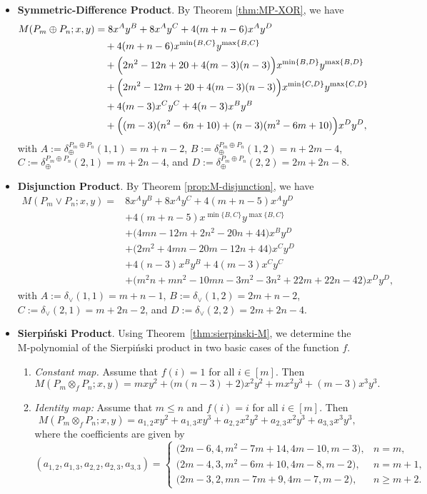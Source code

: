\documentclass[letterpaper,12pt]{article}
\begin{document}
\begin{itemize}
\item\textbf{Symmetric-Difference Product}. 
By Theorem \ref{thm:MP-XOR}, we have 
\[
\begin{aligned}
M(P_m\oplus P_n;x,y) & = 
8x^{A}y^{B}+8x^{A}y^{C}+4(m+n-6)x^{A}y^{D}\\
&\quad  +4(m+n-6) x^{\min\{B,C\}}y^{\max\{B,C\}}\\
&\quad  +\Bigl(2n^2-12n+20+4(m-3)(n-3)\Bigr) x^{\min\{B,D\}}y^{\max\{B,D\}}\\
&\quad  +\Bigl(2m^2-12m+20+4(m-3)(n-3)\Bigr) x^{\min\{C,D\}}y^{\max\{C,D\}}\\
&\quad  +4(m-3)x^{C}y^{C}+4(n-3)x^{B}y^{B}\\
&\quad  +\Bigl((m-3)(n^2-6n+10)+(n-3)(m^2-6m+10)\Bigr) x^{D}y^{D},
\end{aligned}
\]
with $A:=\delta_\oplus^{P_m\oplus P_n}(1,1)=m+n-2$, $B:=\delta_\oplus^{P_m\oplus P_n}(1,2)=n+2m-4$, $C:=\delta_\oplus^{P_m\oplus P_n}(2,1)=m+2n-4$, and $D:=\delta_\oplus^{P_m\oplus P_n}(2,2)=2m+2n-8$.


\item\textbf{Disjunction Product}. By Theorem \ref{prop:M-disjunction}, we have 
\[
\begin{aligned}
M(P_m\vee P_n;x,y)= &
8x^{A}y^{B}+8x^{A}y^{C}
+4(m+n-5)x^{A}y^{D}
\\
&+4(m+n-5)x^{\min\{B,C\}}y^{\max\{B,C\}}\\
& +\bigl(4mn-12m+2n^2-20n+44\bigr)x^{B}y^{D}
\\
&+\bigl(2m^2+4mn-20m-12n+44\bigr)x^{C}y^{D}\\
&  +4(n-3)x^{B}y^{B}+4(m-3)x^{C}y^{C}\\
& +\bigl(m^2n+mn^2-10mn-3m^2-3n^2+22m+22n-42\bigr)x^{D}y^{D},
\end{aligned}
\]
with $A:=\delta_\vee(1,1)=m+n-1$, $B:=\delta_\vee(1,2)=2m+n-2$, $C:=\delta_\vee(2,1)=m+2n-2$, and $D:=\delta_\vee(2,2)=2m+2n-4$.

\item\textbf{Sierpi\'{n}ski Product}. Using Theorem~\ref{thm:sierpinski-M}, we determine the M-polynomial of the Sierpi\'{n}ski product in two basic cases of the function $f$. 
\begin{enumerate}
 
 
\item \textit{Constant map.} Assume that $f(i)=1$ for all $i\in [m]$.  Then
\[
M(P_m\otimes_f P_n;x,y)
=
mxy^2+\bigl(m(n-3)+2\bigr)x^2y^2
+mx^2y^3+(m-3)x^3y^3.
\]
\item  \textit{Identity map:} Assume that $m\le n$ and $f(i)=i$ for all $i\in [m]$. Then
     \[
M(P_m\otimes_f P_n;x,y)
= a_{1,2} x y^{2}
+ a_{1,3} x y^{3}
+ a_{2,2} x^{2} y^{2}
+ a_{2,3} x^{2} y^{3}
+ a_{3,3} x^{3} y^{3},
\]
where the coefficients are given  by
\[
(a_{1,2},a_{1,3},a_{2,2},a_{2,3},a_{3,3})=
\begin{cases}
\bigl(2m-6, 4, m^{2}-7m+14, 4m-10, m-3\bigr), & n=m,\\[2mm]
\bigl(2m-4, 3, m^{2}-6m+10, 4m-8, m-2\bigr), & n=m+1,\\[2mm]
\bigl(2m-3, 2, mn-7m+9, 4m-7, m-2\bigr), & n\ge m+2.
\end{cases}
\] 
\end{enumerate}
\end{itemize}
\end{document}

